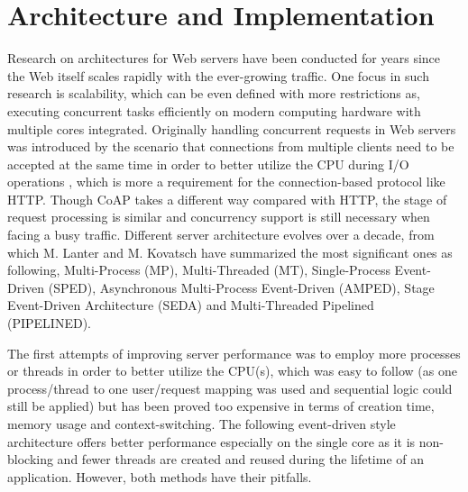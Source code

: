 \chapter{Architecture and Implementation}\label{ch4}

Research on architectures for Web servers have been conducted for years since the Web itself scales rapidly with the ever-growing traffic. One focus in such research is scalability, which can be even defined with more restrictions as, executing concurrent tasks efficiently on modern computing hardware with multiple cores integrated. Originally handling concurrent requests in Web servers was introduced by the scenario that connections from multiple clients need to be accepted at the same time in order to better utilize the CPU during I/O operations \autocite{kovatsch2015scalable}, which is more a requirement for the connection-based protocol like HTTP. Though CoAP takes a different way compared with HTTP, the stage of request processing is similar and concurrency support is still necessary when facing a busy traffic. Different server architecture evolves over a decade, from which M. Lanter \autocite{lanter2013scalability} and M. Kovatsch \autocite{kovatsch2015scalable} have summarized the most significant ones as following, Multi-Process (MP), Multi-Threaded (MT), Single-Process Event-Driven (SPED), Asynchronous Multi-Process Event-Driven (AMPED), Stage Event-Driven Architecture (SEDA) and Multi-Threaded Pipelined (PIPELINED). 

The first attempts of improving server performance was to employ more processes or threads in order to better utilize the CPU(s), which was easy to follow (as one process/thread to one user/request mapping was used and sequential logic could still be applied) but has been proved too expensive in terms of creation time, memory usage and context-switching. The following event-driven style architecture offers better performance especially on the single core as it is non-blocking and fewer threads are created and reused during the lifetime of an application. However, both methods have their pitfalls. 

